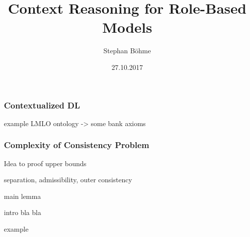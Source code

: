 \documentclass[t,nototalpages,useheader=false]{tudbeamer}
\title{Context Reasoning for Role-Based Models}
\author{Stephan Böhme}
\date{27.10.2017}
\begin{document}




\begin{frame}
  \frametitle{Contextualized DL \LMLO}




 
\end{frame}

\begin{frame}
  example LMLO ontology -> some bank axioms
\end{frame}

\begin{frame}
  \frametitle{Complexity of Consistency Problem}
\end{frame}

\begin{frame}
  Idea to proof upper bounds

  separation, admissibility, outer consistency
\end{frame}

\begin{frame}
  main lemma
\end{frame}


\begin{frame}
  intro bla bla
\end{frame}

\begin{frame}
  example
\end{frame}













\end{document}
